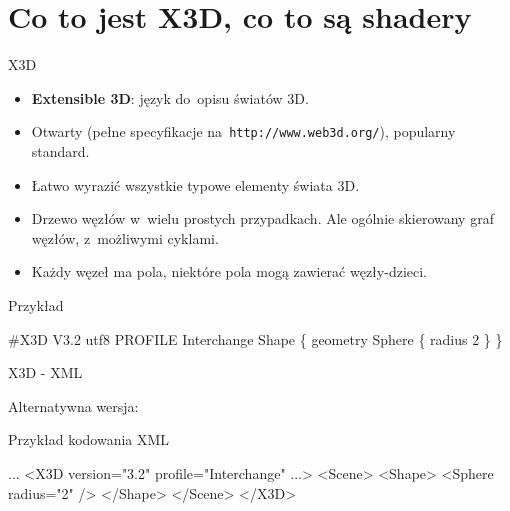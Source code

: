 \documentclass{beamer}
\begin{document}
\section{Co to jest X3D, co to są shadery}

\begin{frame}[fragile]{X3D}

\begin{itemize}
  \item \textbf{Extensible 3D}: język do~opisu światów 3D.
  \item Otwarty (pełne specyfikacje na~\texttt{http://www.web3d.org/}), popularny standard.
  \item Łatwo wyrazić wszystkie typowe elementy świata 3D.
  \item Drzewo węzłów w~wielu prostych przypadkach.
    Ale ogólnie skierowany graf węzłów, z~możliwymi cyklami.
  \item Każdy węzeł ma pola, niektóre pola mogą zawierać węzły-dzieci.
\end{itemize}

\begin{exampleblock}{Przykład}
\begin{semiverbatim}
\#X3D V3.2 utf8
PROFILE Interchange
Shape \{
  geometry Sphere \{ radius 2 \}
\}
\end{semiverbatim}
\end{exampleblock}
\end{frame}

\begin{frame}[fragile]{X3D - XML}

Alternatywna wersja:

\begin{exampleblock}{Przykład kodowania XML}
\begin{semiverbatim}
...
<X3D version="3.2" profile="Interchange" ...>
  <Scene>
    <Shape>
      <Sphere radius="2" />
    </Shape>
  </Scene>
</X3D>
\end{semiverbatim}
\end{exampleblock}

\end{frame}
\end{document}
